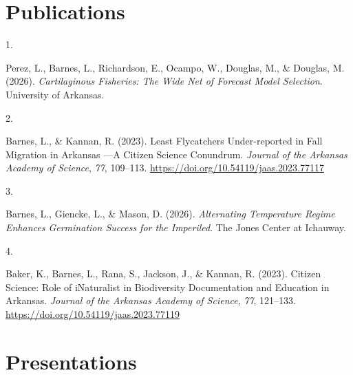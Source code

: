 \documentclass[10pt,a4paper,]{article}
\newlength{\cslhangindent}
\newlength{\csllabelwidth}
\newenvironment{CSLReferences}[2] %
 {\begin{list}{}{%
  \setlength{\itemindent}{0pt}
  \setlength{\leftmargin}{0pt}
  \setlength{\parsep}{0pt}
  \ifodd #1
   \setlength{\leftmargin}{\cslhangindent}
   \setlength{\itemindent}{-1\cslhangindent}
  \fi
  \setlength{\itemsep}{#2\baselineskip}}}
 {\end{list}}
\newcommand{\CSLLeftMargin}[1]{\parbox[t]{\csllabelwidth}{\strut#1\strut}}
\newcommand{\CSLRightInline}[1]{\parbox[t]{\linewidth - \csllabelwidth}{\strut#1\strut}}
\begin{document}
\section{Publications}\label{publications}

\label{refs-b1e67bb4aa92b28e3fb3626524a9c438}
\begin{CSLReferences}{0}{0}
\CSLLeftMargin{1. }%
\CSLRightInline{Perez, L., Barnes, L., Richardson, E., Ocampo, W.,
Douglas, M., \& Douglas, M. (2026). \emph{Cartilaginous Fisheries: The
Wide Net of Forecast Model Selection}. University of Arkansas.}

\CSLLeftMargin{2. }%
\CSLRightInline{Barnes, L., \& Kannan, R. (2023). Least Flycatchers
Under-reported in Fall Migration in Arkansas ---A Citizen Science
Conundrum. \emph{Journal of the Arkansas Academy of Science}, \emph{77},
109--113. \url{https://doi.org/10.54119/jaas.2023.77117}}

\CSLLeftMargin{3. }%
\CSLRightInline{Barnes, L., Giencke, L., \& Mason, D. (2026).
\emph{Alternating Temperature Regime Enhances Germination Success for
the Imperiled}. The Jones Center at Ichauway.}

\CSLLeftMargin{4. }%
\CSLRightInline{Baker, K., Barnes, L., Rana, S., Jackson, J., \& Kannan,
R. (2023). Citizen Science: Role of iNaturalist in Biodiversity
Documentation and Education in Arkansas. \emph{Journal of the Arkansas
Academy of Science}, \emph{77}, 121--133.
\url{https://doi.org/10.54119/jaas.2023.77119}}

\end{CSLReferences}

\section{Presentations}\label{presentations}
\end{document}
